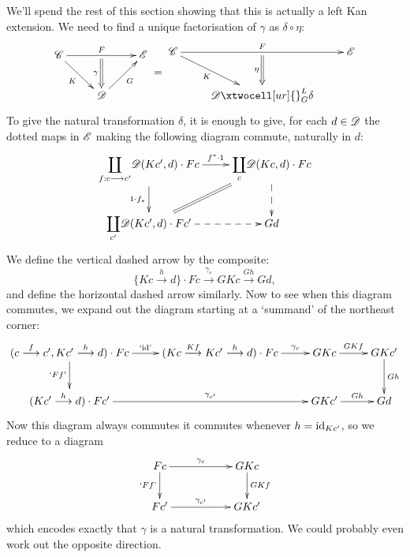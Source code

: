 \documentclass[11pt]{article}
\begin{document}
\begin{1. Kan Extensions}
We'll spend the rest of this section showing that this is actually a left Kan extension. We need %
to find a unique factorisation of $\gamma$ as $\delta\circ\eta$:
\[\vcenter{\xymatrix{
\scrC\ar[rd]_-{K}\ar[rr]^-{F}_-{}="arF"&%
&%
\scrE\\%
&%
\scrD\ar@{=>}"arF";[]_-{\gamma}
\ar[ur]_-{G}
}}
=
\vcenter{\xymatrix{
\scrC\ar[rd]_-{K}\ar[rr]^-{F}_-{}="arF"&%
&%
\scrE\\%
&%
\scrD\ar@{=>}"arF";[]_-{\eta}
\xtwocell[ur]{}_{G}^{L}{{\delta}}&%
}}
\]
To give the natural transformation $\delta$, it is enough to give, for each $d\in\mathscr{D}$ the dotted maps in $\mathscr{E}$ making the following diagram commute, naturally in $d$:
\[\vcenter{\xymatrix{
{\displaystyle\coprod_{f:c\to c'}}\scrD(Kc',d)\cdot Fc\ar[r]^-{f^*\cdot1}\ar[d]_-{1\cdot f_*}&%
\ar@{-->}[d]{\displaystyle\coprod_{c}}\scrD(Kc,d)\cdot Fc\ar@{=}[ld]\\%
\ar@{-->}[r]{\displaystyle\coprod_{c'}}\scrD(Kc',d)\cdot Fc'&%
Gd%
}}\]
We define the vertical dashed arrow by the composite:
\[\{Kc\overset{h}{\to}d\}\cdot Fc\overset{\gamma_c}{\to}GKc\overset{Gh}{\to}Gd,\]
and define the horizontal dashed arrow similarly. Now to see when this diagram commutes, we expand out the diagram starting at a `summand' of the northeast corner:
\[\vcenter{\xymatrix{
(c\overset{f}{\to}c',Kc'\overset{h}{\to}d)\cdot Fc\ar@{->}[r]^-{\textup{`id'}}\ar[d]_-{\textup{`$Ff$'}}&%
\ar@{->}[r]^-{\gamma_c}(Kc\overset{Kf}{\to}Kc'\overset{h}{\to}d)\cdot Fc&%
GKc\ar[r]^-{GKf}&
GKc'\ar[d]^-{Gh}\\
\ar@{->}[rr]^-{\gamma_{c'}}(Kc'\overset{h}{\to}d)\cdot Fc'&&
GKc'\ar[r]^-{Gh}&Gd
}}\]
Now this diagram always commutes \Iff it commutes whenever $h=\textup{id}_{Kc'}$, so we reduce to a diagram
\[\vcenter{\xymatrix{
Fc\ar@{->}[rr]^-{\gamma_c}\ar[d]_-{\textup{`$Ff$'}}&&%
GKc\ar[d]^-{GKf}\\
\ar@{->}[rr]^-{\gamma_{c'}}Fc'&&
GKc'
}}\]
which encodes exactly that $\gamma$ is a natural transformation. We could probably even work out the opposite direction.

\end{1. Kan Extensions}
\end{document}
